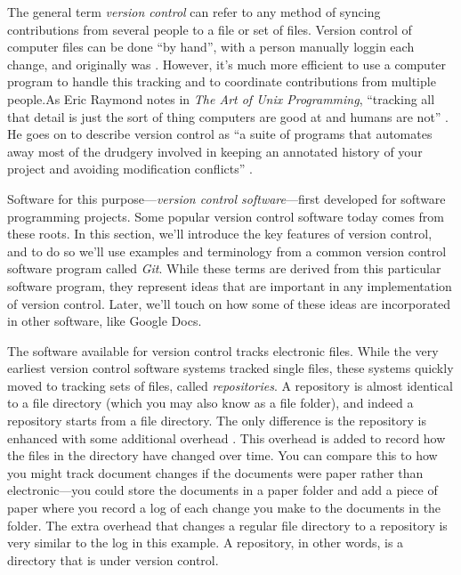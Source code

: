 \documentclass[]{tufte-book}
\begin{document}
The general term \emph{version control} can refer to any method of syncing
contributions from several people to a file or set of files. Version control of
computer files can be done ``by hand'', with a person manually loggin each change,
and originally was \citep{irving2011astonishments}. However, it's much more efficient
to use a computer program to handle this tracking and to coordinate
contributions from multiple people.As Eric Raymond notes in \emph{The Art of Unix
Programming}, ``tracking all that detail is just the sort of thing computers are
good at and humans are not'' \citep{raymond2003art}. He goes on to describe version
control as ``a suite of programs that automates away most of the drudgery
involved in keeping an annotated history of your project and avoiding
modification conflicts'' \citep{raymond2003art}.

Software for this purpose---\emph{version control software}---first developed for
software programming projects. Some popular version control software today
comes from these roots. In this section, we'll introduce the key features of
version control, and to do so we'll use examples and terminology from a common
version control software program called \emph{Git}. While these terms are derived
from this particular software program, they represent ideas that are important
in any implementation of version control. Later, we'll touch on how some of these
ideas are incorporated in other software, like Google Docs.

The software available for version control tracks electronic files. While the
very earliest version control software systems tracked single files, these
systems quickly moved to tracking sets of files, called \emph{repositories}. A
repository is almost identical to a file directory (which you may also know as a
file folder), and indeed a repository starts from a file directory. The only
difference is the repository is enhanced with some additional overhead
\citep{klemens201421st}. This overhead is added to record how the files in the
directory have changed over time. You can compare this to how you might track
document changes if the documents were paper rather than electronic---you could
store the documents in a paper folder and add a piece of paper where you record
a log of each change you make to the documents in the folder. The extra overhead
that changes a regular file directory to a repository is very similar to the log
in this example. A repository, in other words, is a directory that is under
version control.
\end{document}
